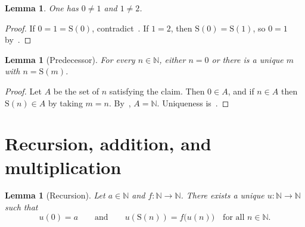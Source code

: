 \documentclass[11pt,reqno]{amsart}
\theoremstyle{plain}
\newtheorem{lemma}[theorem]{Lemma}
\theoremstyle{definition}
\theoremstyle{remark}
\newcommand{\N}{\mathbb{N}}
\newcommand{\Suc}{\mathrm{S}}
\numberwithin{equation}{section}
\begin{document}
\begin{lemma}
\label{lem:0neq1}
One has \(0\neq 1\) and \(1\neq 2\).
\end{lemma}

\begin{proof}
If \(0=1=\Suc(0)\), contradict~. If \(1=2\), then
\(\Suc(0)=\Suc(1)\), so \(0=1\) by~.
\end{proof}

\begin{lemma}[Predecessor]
\label{lem:pred}
For every \(n\in\N\), either \(n=0\) or there is a unique \(m\) with
\(n=\Suc(m)\).
\end{lemma}

\begin{proof}
Let \(A\) be the set of \(n\) satisfying the claim. Then \(0\in A\),
and if \(n\in A\) then \(\Suc(n)\in A\) by taking \(m=n\).
By~, \(A=\N\). Uniqueness is~.
\end{proof}

\section{Recursion, addition, and multiplication}
\label{sec:arith}

\begin{lemma}[Recursion]
\label{lem:recursion}
Let \(a\in\N\) and \(f\colon\N\to\N\). There exists a unique
\(u\colon\N\to\N\) such that
\begin{equation}
\label{eq:recursion}
  u(0)=a\qquad\text{and}\qquad
  u(\Suc(n))=f\bigl(u(n)\bigr)
  \quad\text{for all }n\in\N.
\end{equation}
\end{lemma}
\end{document}
